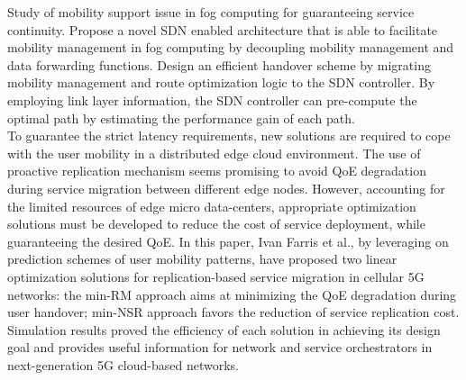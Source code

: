 \cite{bi2018mobility}
Study of mobility support issue in fog computing for guaranteeing service continuity. Propose a novel SDN enabled architecture that is able to facilitate mobility management in fog computing by decoupling mobility management and data forwarding functions. Design an efficient handover scheme by migrating mobility management and route optimization logic to the SDN controller. By employing link layer information, the SDN controller can pre-compute the optimal path by estimating the performance gain of each path.\\

\cite{farris2017optimizing}
To guarantee the strict latency requirements, new solutions are required to cope with the user mobility in a distributed edge cloud environment. The use of proactive replication mechanism seems promising to avoid QoE degradation during service migration between different edge nodes. However, accounting for the limited resources of edge micro data-centers, appropriate optimization solutions must be developed to reduce the cost of service deployment, while guaranteeing the desired QoE. In this paper, Ivan Farris et al., by leveraging on prediction schemes of user mobility patterns, have proposed two linear optimization solutions for replication-based service migration in cellular 5G networks: the min-RM approach aims at minimizing the QoE degradation during user handover; min-NSR approach favors the reduction of service replication cost. Simulation results proved the efficiency of each solution in achieving its design goal and provides useful information for network and service orchestrators in next-generation 5G cloud-based networks.




